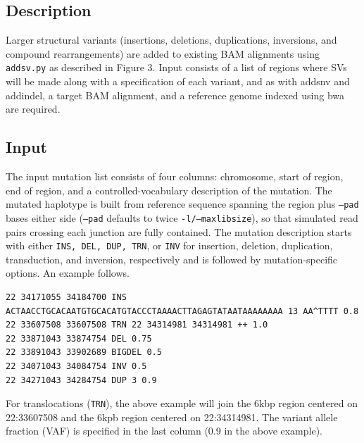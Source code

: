 \documentclass[letterpaper,11pt]{article}
\begin{document}
\subsection{Description}
   Larger structural variants (insertions, deletions, duplications, inversions, and compound rearrangements) are added to existing BAM alignments using \texttt{addsv.py} as described in Figure 3. Input consists of a list of regions where SVs will be made along with a specification of each variant, and as with addsnv and addindel, a target BAM alignment, and a reference genome indexed using bwa are required.

\subsection{Input}
    The input mutation list consists of four columns: chromosome, start of region, end of region, and a controlled-vocabulary description of the mutation. The mutated haplotype is built from reference sequence spanning the region plus \texttt{--pad} bases either side (\texttt{--pad} defaults to twice \texttt{-l/--maxlibsize}), so that simulated read pairs crossing each junction are fully contained. The mutation description starts with either \texttt{INS, DEL, DUP, TRN}, or \texttt{INV} for insertion, deletion, duplication, transduction, and inversion, respectively and is followed by mutation-specific options. An example follows.

\begin{verbatim}
22 34171055 34184700 INS ACTAACCTGCACAATGTGCACATGTACCCTAAAACTTAGAGTATAATAAAAAAAA 13 AA^TTTT 0.8
22 33607508 33607508 TRN 22 34314981 34314981 ++ 1.0
22 33871043 33874754 DEL 0.75
22 33891043 33902689 BIGDEL 0.5
22 34071043 34084754 INV 0.5
22 34271043 34284754 DUP 3 0.9
\end{verbatim}

   For translocations (\texttt{TRN}), the above example will join the 6kbp region centered on 22:33607508 and the 6kpb region centered on 22:34314981. The variant allele fraction (VAF) is specified in the last column (0.9 in the above example).
\end{document}
